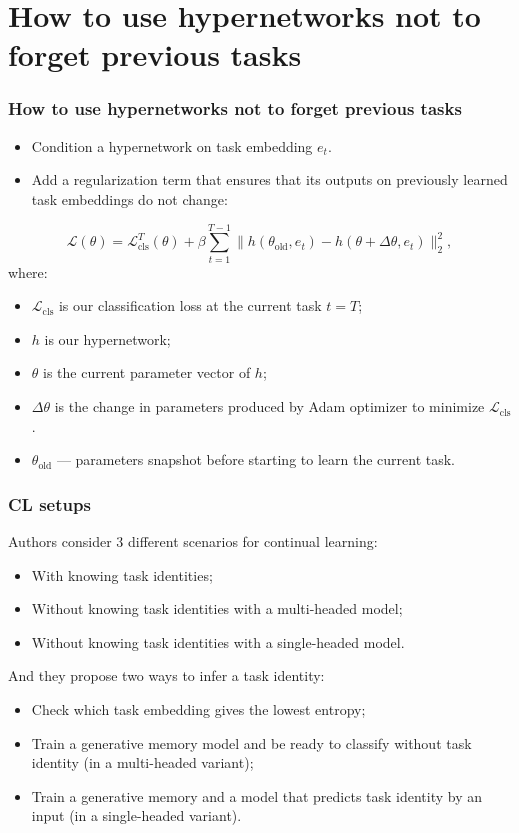 \documentclass[10pt]{beamer}
\begin{document}
\section{How to use hypernetworks not to forget previous tasks}
\begin{frame}
    \frametitle{How to use hypernetworks not to forget previous tasks}
    
    \begin{itemize}
        \item\pause Condition a hypernetwork on task embedding $e_t$.
        \item\pause Add a regularization term that ensures that its outputs on previously learned task embeddings do not change:
    \end{itemize}
    
    \begin{equation*}
        \mathcal{L}(\theta) = \mathcal{L}^T_\text{cls}(\theta) + \beta \sum_{t=1}^{T-1} \| h(\theta_\text{old}, e_t) - h(\theta + \Delta \theta, e_t) \|_2^2,
    \end{equation*}
    where:
    \begin{itemize}
        \item\pause $\mathcal{L}_\text{cls}$ is our classification loss at the current task $t = T$;
        \item\pause $h$ is our hypernetwork;
        \item\pause $\theta$ is the current parameter vector of $h$;
        \item\pause $\Delta \theta$ is the change in parameters produced by Adam optimizer to minimize $\mathcal{L}_\text{cls}$.
        \item\pause $\theta_\text{old}$ --- parameters snapshot before starting to learn the current task.
    \end{itemize}
\end{frame}


\begin{frame}
    \frametitle{CL setups}
    Authors consider 3 different scenarios for continual learning:
    
    \begin{itemize}
        \item\pause With knowing task identities;
        \item\pause Without knowing task identities with a multi-headed model;
        \item\pause Without knowing task identities with a single-headed model.
    \end{itemize}
    
    And they propose two ways to infer a task identity:
    \begin{itemize}
        \item\pause Check which task embedding gives the lowest entropy;
        \item\pause Train a generative memory model and be ready to classify without task identity (in a multi-headed variant);
        \item\pause Train a generative memory and a model that predicts task identity by an input (in a single-headed variant).
    \end{itemize}
\end{frame}
\end{document}
